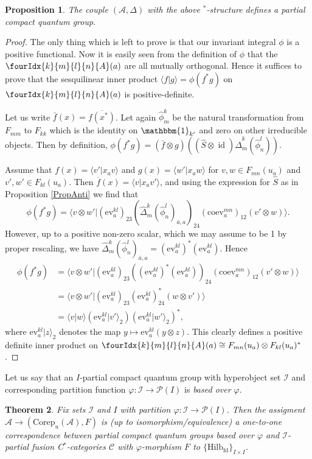 \documentclass[10pt]{article}
\DeclareMathOperator{\fin}{\mathrm{fd}}
\DeclareMathOperator{\id}{id}
\newcommand{\Corep}{\mathrm{Corep}}
\newcommand{\CatCC}{\mathscr{C}}
\newcommand{\Hilb}{\mathrm{Hilb}}
\newcommand{\ev}{\mathrm{ev}}
\newcommand{\coev}{\mathrm{coev}}
\newcommand{\Unitb}{\mathbbm{1}}
\newcommand{\Gr}[5]{\fourIdx{#2}{#4}{#3}{#5}{#1}}%
\newtheorem{Theorem}{Theorem}[section]
\newtheorem{Prop}[Theorem]{Proposition}
\theoremstyle{definition}
\numberwithin{equation}{section}
\begin{document}
\begin{Prop} The couple $(\mathscr{A},\Delta)$ with the above $^*$-structure defines a partial compact quantum group.
\end{Prop}
\begin{proof} The only thing which is left to prove is that our
  invariant integral $\phi$ is a positive functional. Now it is easily
  seen from the definition of $\phi$ that the $\Gr{A}{k}{l}{m}{n}(a)$
  are all mutually orthogonal. Hence it suffices to prove that the
  sesquilinear inner product $\langle f| g\rangle = \phi(f^*g)$ on
  $\Gr{A}{k}{l}{m}{n}(a)$ is positive-definite.

  Let us write $\bar{f}(x) = \overline{f(x^*)}$. Let again
  $\hat{\phi}^k_m$ be the natural transformation from $F_{mm}$ to
  $F_{kk}$ which is the identity on $\Unitb_{k'}$ and zero on other
  irreducible objects. Then by definition, $\phi(f^*g) =
  (\bar{f}\otimes g)((\hat{S}\otimes
  \id)\hat{\Delta}^k_m(\hat{\phi}^l_n)).$

Assume  that $f(x) = \langle v'| x_a v\rangle$ and
  $g(x) = \langle w' | x_aw\rangle$ for $v,w\in F_{mn}(u_a)$ and
  $v',w'\in F_{kl}(u_a)$. Then
  $\overline{f}(x) = \langle v|x_{a} v'\rangle$, and
 using the expression for $\hat{S}$ as
  in Proposition \ref{PropAnti} we find that
  \[
    \phi(f^*g) = \langle v \otimes w'|
    (\ev_{a}^{kl})_{23} 
    (\hat\Delta^{k}_{m}(\hat \phi^{l}_{n})_{\bar a, a})_{24} 
    (\coev^{mn}_{a})_{12} (v'\otimes
    w)\rangle.\]
  However, up to a positive non-zero scalar, which we may assume to be
  1 by proper rescaling, we
  have $\hat{\Delta}^k_m(\hat{\phi}^l_n)_{\bar{a}, a} =
  (\ev^{kl}_{a})^{*}(\ev^{kl}_{a}).$ Hence
  \begin{align*}
    \phi(f^*g) &=
\langle v \otimes w'|     (\ev^{kl}_{a})_{23}  (
  (\ev^{kl}_{a})^{*}(\ev^{kl}_{a}))_{24}
 (\coev^{mn}_{a})_{12} (v'\otimes w)\rangle \\
&= \langle v \otimes w'|        (\ev^{kl}_{a})_{23} 
  (\ev^{kl}_{a})^{*}_{24}
 (w\otimes v')\rangle \\
    &= \langle v|w\rangle (\ev^{kl}_{a}|v'\rangle_{2})
    (\ev_{a}^{kl}|w'\rangle_{2})^{*},
  \end{align*}
where $\ev_{a}^{kl}|z\rangle_{2}$ denotes the map $y \mapsto
\ev_{a}^{kl}(y\otimes z)$. This clearly defines a positive definite inner product on $\Gr{A}{k}{l}{m}{n}(a) \cong F_{mn}(u_a)\otimes F_{kl}(u_a)^*$.
\end{proof} 


Let us say that an $I$-partial compact quantum group with hyperobject set
$\mathscr{I}$ and corresponding partition function $\varphi \colon \mathscr{I} \to
\mathscr{P}(I)$  is \emph{based over $\varphi$}.
\begin{Theorem} \label{TheoTKPCQG} Fix sets $\mathcal{I}$ and $I$ with partition $\varphi:\mathscr{I}\rightarrow \mathscr{P}(I)$. Then the assigment $\mathscr{A}\rightarrow (\Corep_u(\mathscr{A}),F)$ is (up to isomorphism/equivalence) a one-to-one correspondence between partial compact quantum groups based over $\varphi$ and $\mathscr{I}$-partial fusion C$^*$-categories $\CatCC$ with $\varphi$-morphism $F$ to $\{\Hilb_{\fin}\}_{I\times I}$.
\end{Theorem} 
\end{document}
